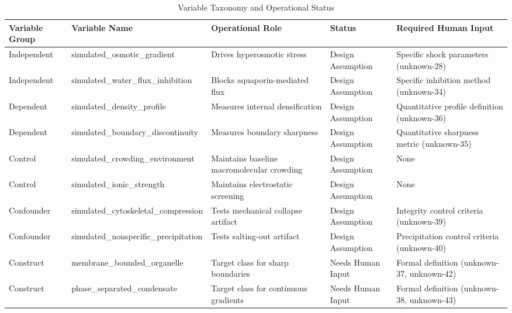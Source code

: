 \documentclass[conference]{IEEEtran}
\begin{document}
\begin{table}[htbp]
\centering
\footnotesize
\setlength{\tabcolsep}{3pt}
\renewcommand{\arraystretch}{1.12}
\caption{Variable Taxonomy and Operational Status}
\label{tab:appendix-variables-and-definitions-blk-var-table}
\begin{tabular}{|p{}|p{}|p{}|p{}|p{}|}
\hline
Variable Group & Variable Name & Operational Role & Status & Required Human Input \\\hline
Independent & simulated\_osmotic\_gradient & Drives hyperosmotic stress & Design Assumption & Specific shock parameters (unknown-28) \\\hline
Independent & simulated\_water\_flux\_inhibition & Blocks aquaporin-mediated flux & Design Assumption & Specific inhibition method (unknown-34) \\\hline
Dependent & simulated\_density\_profile & Measures internal densification & Design Assumption & Quantitative profile definition (unknown-36) \\\hline
Dependent & simulated\_boundary\_discontinuity & Measures boundary sharpness & Design Assumption & Quantitative sharpness metric (unknown-35) \\\hline
Control & simulated\_crowding\_environment & Maintains baseline macromolecular crowding & Design Assumption & None \\\hline
Control & simulated\_ionic\_strength & Maintains electrostatic screening & Design Assumption & None \\\hline
Confounder & simulated\_cytoskeletal\_compression & Tests mechanical collapse artifact & Design Assumption & Integrity control criteria (unknown-39) \\\hline
Confounder & simulated\_nonspecific\_precipitation & Tests salting-out artifact & Design Assumption & Precipitation control criteria (unknown-40) \\\hline
Construct & membrane\_bounded\_organelle & Target class for sharp boundaries & Needs Human Input & Formal definition (unknown-37, unknown-42) \\\hline
Construct & phase\_separated\_condensate & Target class for continuous gradients & Needs Human Input & Formal definition (unknown-38, unknown-43) \\\hline
\end{tabular}
\end{table}
\end{document}
